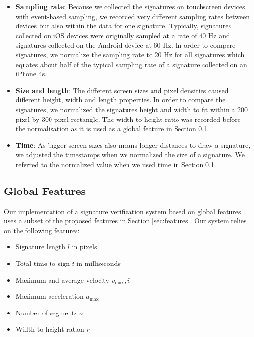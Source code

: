 \documentclass[a4paper, oneside]{csthesis}
\begin{document}
\begin{itemize}
\item \textbf{Sampling rate}: Because we collected the signatures on touchscreen devices with event-based sampling, we recorded very different sampling rates between devices but also within the data for one signature. Typically, signatures collected on iOS devices were originally sampled at a rate of 40 Hz and signatures collected on the Android device at 60 Hz. In order to compare signatures, we normalize the sampling rate to 20 Hz for all signatures which equates about half of the typical sampling rate of a signature collected on an iPhone 4s.
\item \textbf{Size and length}: The different screen sizes and pixel densities caused different height, width and length properties. In order to compare the signatures, we normalized the signatures height and width to fit within a 200 pixel by 300 pixel rectangle. The width-to-height ratio was recorded before the normalization as it is used as a global feature in Section \ref{sec:global-features}.
\item \textbf{Time}: As bigger screen sizes also means longer distances to draw a signature, we adjusted the timestamps when we normalized the size of a signature. We referred to the normalized value when we used time in Section \ref{sec:global-features}.
\end{itemize}





\subsection{Global Features}
\label{sec:global-features}

Our implementation of a signature verification system based on global features uses a subset of the proposed features in Section \ref{sec:features}. Our system relies on the following features:

\begin{itemize}
\item Signature length $l$ in pixels
\item Total time to sign  $t$ in milliseconds
\item Maximum and average velocity $v_\text{max}, \bar{v}$
\item Maximum acceleration $a_\text{max}$
\item Number of segments $n$
\item Width to height ration $r$
\end{itemize}
\end{document}
